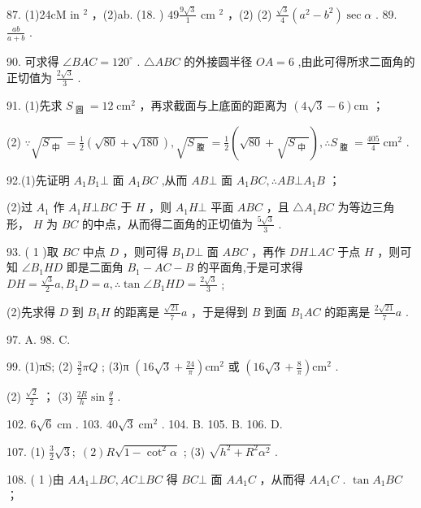 \documentclass[10pt]{article}
\begin{document}
87. (1)24cM in \({}^{2}\) ，(2)ab. (18. ) \({49}\frac{9\sqrt{3}}{1}\) cm \({}^{2}\) ，(2) (2) \(\frac{\sqrt{3}}{4}\left( {{a}^{2} - {b}^{2}}\right) \sec \alpha\) . 89. \(\frac{ab}{a + b}\) .

90. 可求得 \(\angle {BAC} = {120}^{ \circ  }\) . \(\bigtriangleup {ABC}\) 的外接圆半径 \({OA} = 6\) ,由此可得所求二面角的正切值为 \(\frac{2\sqrt{3}}{3}\) .

91. (1)先求 \({S}_{\text{ 圆 }} = {12}{\mathrm{\;{cm}}}^{2}\) ，再求截面与上底面的距离为 \(\left( {4\sqrt{3} - 6}\right) \mathrm{{cm}}\) ；

(2) \(\because \sqrt{{S}_{\text{ 中 }}} = \frac{1}{2}\left( {\sqrt{80} + \sqrt{180}}\right) ,\sqrt{{S}_{\text{ 腹 }}} = \frac{1}{2}\left( {\sqrt{80} + \sqrt{{S}_{\text{ 中 }}}}\right) ,\therefore {S}_{\text{ 腹 }} = \frac{405}{4}{\mathrm{\;{cm}}}^{2}\) .

92.(1)先证明 \({A}_{1}{B}_{1} \bot\) 面 \({A}_{1}{BC}\) ,从而 \({AB} \bot\) 面 \({A}_{1}{BC},\therefore {AB} \bot  {A}_{1}B\) ；

(2)过 \({A}_{1}\) 作 \({A}_{1}H \bot  {BC}\) 于 \(H\) ，则 \({A}_{1}H \bot\) 平面 \({ABC}\) ，且 \(\bigtriangleup {A}_{1}{BC}\) 为等边三角形， \(H\) 为 \({BC}\) 的中点，从而得二面角的正切值为 \(\frac{5\sqrt{3}}{3}\) .

93. ( 1 )取 \({BC}\) 中点 \(D\) ，则可得 \({B}_{1}D \bot\) 面 \({ABC}\) ，再作 \({DH} \bot  {AC}\) 于点 \(H\) ，则可知 \(\angle {B}_{1}{HD}\) 即是二面角 \({B}_{1} - {AC} - B\) 的平面角,于是可求得 \({DH} = \frac{\sqrt{3}}{2}a,{B}_{1}D = a,\therefore \tan \angle {B}_{1}{HD} = \frac{2\sqrt{3}}{3}\) ;

(2)先求得 \(D\) 到 \({B}_{1}H\) 的距离是 \(\frac{\sqrt{21}}{7}a\) ，于是得到 \(B\) 到面 \({B}_{1}{AC}\) 的距离是 \(\frac{2\sqrt{21}}{7}a\) .

97. A. 98. C.

99. (1)πS; (2) \(\frac{3}{2}{\pi Q}\) ; (3)π \(\left( {{16}\sqrt{3} + \frac{24}{\pi }}\right) {\mathrm{{cm}}}^{2}\) 或 \(\left( {{16}\sqrt{3} + \frac{8}{\pi }}\right) {\mathrm{{cm}}}^{2}\) .

(2) \(\frac{\sqrt{2}}{2}\) ； (3) \(\frac{2R}{h}\sin \frac{\theta }{2}\) .

102. \(6\sqrt{6}\mathrm{\;{cm}}\) . 103. \({40}\sqrt{3}{\mathrm{\;{cm}}}^{2}\) . 104. B. 105. B. 106. D.

107. (1) \(\frac{3}{2}\sqrt{3};\;\left( 2\right) R\sqrt{1 - {\cot }^{2}\alpha }\) ; (3) \(\sqrt{{h}^{2} + {R}^{2}{\alpha }^{2}}\) .

108. ( 1 )由 \(A{A}_{1} \bot  {BC},{AC} \bot  {BC}\) 得 \({BC} \bot\) 面 \(A{A}_{1}C\) ，从而得 \(A{A}_{1}C\) . \(\tan {A}_{1}{BC}\) ；
\end{document}
